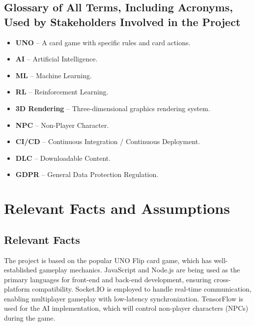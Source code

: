 \documentclass{article}
\begin{document}
\subsection{Glossary of All Terms, Including Acronyms, Used by Stakeholders Involved in the Project}

\begin{itemize}
    \item \textbf{UNO} – A card game with specific rules and card actions.
    \item \textbf{AI} – Artificial Intelligence.
    \item \textbf{ML} – Machine Learning.
    \item \textbf{RL} – Reinforcement Learning.
    \item \textbf{3D Rendering} – Three-dimensional graphics rendering system.
    \item \textbf{NPC} – Non-Player Character.
    \item \textbf{CI/CD} – Continuous Integration / Continuous Deployment.
    \item \textbf{DLC} – Downloadable Content.
    \item \textbf{GDPR} – General Data Protection Regulation.
\end{itemize}

\section{Relevant Facts and Assumptions}

\subsection{Relevant Facts}
The project is based on the popular UNO Flip card game, which has well-established gameplay mechanics. JavaScript and Node.js are being used as the primary languages for front-end and back-end development, ensuring cross-platform compatibility. Socket.IO is employed to handle real-time communication, enabling multiplayer gameplay with low-latency synchronization. TensorFlow is used for the AI implementation, which will control non-player characters (NPCs) during the game.
\end{document}
